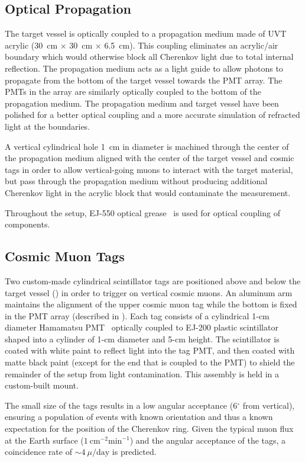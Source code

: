 \subsection{Optical Propagation}
The target vessel is optically coupled to a propagation medium made of UVT acrylic (30~cm $\times$ 30~cm $\times$ 6.5~cm). This coupling eliminates an acrylic/air boundary which would otherwise block all Cherenkov light due to total internal reflection. The propagation medium acts as a light guide to allow photons to propagate from the bottom of the target vessel towards the PMT array. The PMTs in the array are similarly optically coupled to the bottom of the propagation medium. The propagation medium and target vessel have been polished for a better optical coupling and a more accurate simulation of refracted light at the boundaries. 

A vertical cylindrical hole 1~cm in diameter is machined through the center of the propagation medium aligned with the center of the target vessel and cosmic tags in order to allow  vertical-going  muons to interact with the target material, but pass through the propagation medium without producing additional Cherenkov light in the acrylic block that would contaminate the measurement.

Throughout the setup, EJ-550 optical grease~\cite{ej550} is used for optical coupling of components. 


\subsection{Cosmic Muon Tags}

Two custom-made cylindrical scintillator tags are positioned above and below the target vessel () in order to trigger on vertical cosmic muons.  An aluminum arm maintains the alignment of the upper cosmic muon tag while the bottom is fixed in the PMT array (described in ). Each tag consists of a cylindrical 1-cm diameter Hamamatsu PMT~\cite{h3164} optically coupled to EJ-200 plastic scintillator~\cite{ej200} shaped into a cylinder of 1-cm diameter and 5-cm height. The scintillator is coated with white paint to reflect light into the tag PMT, and then coated with matte black paint (except for the end that is coupled to the PMT) to shield the remainder of the setup from light contamination.  This assembly is held in a custom-built mount.

The small size of the tags results in a low angular acceptance (6$^{\circ}$ from vertical), ensuring a population of events with known orientation and thus a known expectation for the position of the Cherenkov ring.  
Given the typical muon flux at the Earth surface ($1~\mbox{cm}^{-2}\mbox{min}^{-1}$) and the angular acceptance of the tags, a coincidence rate of $\sim4~\mu / \mbox{day}$ is predicted. 

